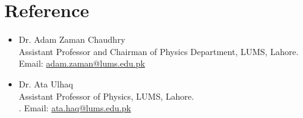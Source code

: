 \documentclass[letterpaper,11pt]{article}
\newcommand{\resumeItemm}[2]{
  \item\small{
    {#1}{#2 \vspace{-2pt}}
  }
}
\newcommand{\jsk}[2]{\resumeItemm{#1}\\{#2}\vspace{-4pt}} %
\newcommand{\resumeSubHeadingListStart}{\begin{itemize}[leftmargin=*]}
\newcommand{\resumeSubHeadingListEnd}{\end{itemize}}
\begin{document}
\section{\textbf{Reference}}

\resumeSubHeadingListStart
    \jsk{Dr. Adam Zaman Chaudhry}
            {Assistant Professor and Chairman of Physics Department, LUMS, Lahore. \\Email: \href{mailto:adam.zaman@lums.edu.pk}{adam.zaman@lums.edu.pk}}
    \jsk{Dr. Ata Ulhaq}
            {Assistant Professor of Physics, LUMS, Lahore. \\.
            Email: \href{mailto:ata.haq@lums.edu.pk}{ata.haq@lums.edu.pk}}        
\resumeSubHeadingListEnd
\end{document}
